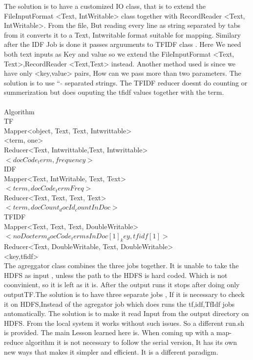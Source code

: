 \documentclass{bigdata}
\newcommand\tab[1][1cm]{\hspace*{#1}}
\begin{document}
The solution is to have a customized IO class, that is to extend the FileInputFormat <Text, IntWritable> class together with RecordReader <Text, IntWritable>. From the file, But reading every line as string separated by tabs from it converts it to a Text, Intwritable format suitable for mapping. Similary after the IDF Job is done it passes arguuments to TFIDF class . Here We need both text inputs as Key and value so we extend the FileInputFormat <Text, Text>,RecordReader <Text,Text> instead. 
Another method used is since we have only <key,value> pairs, How can we pass more than two parameters. The solution is to use $“_”$ separated strings. The TFIDF reducer doesnt do counting or summerization but does ouputing the tfidf values together with the term.\\
\\
Algorithm\\
TF \\
Mapper<object, Text, Text, Intwrittable>\\
      \tab <term, one>\\
Reducer<Text, Intwrittable,Text, Intwrittable>\\
     \tab   $<docCode_term, frequency>$\\
\noindent       
IDF\\
Mapper<Text, IntWritable, Text, Text> \\
     \tab   $<term, docCode_termFreq>$\\
Reducer<Text, Text, Text, Text>\\
    \tab    $<term, docCount_docId_countInDoc>$\\
TFIDF\\
Mapper<Text, Text, Text, DoubleWritable>\\
     \tab    $<noDocterm_docCode_termsInDoc[1]_key, tfidf[1]>$\\
Reducer<Text, DoubleWritable, Text, DoubleWritable>\\
        <key,tfidf>\\
        
The agreggator class combines the three jobs together. It is unable to take the HDFS as input , unless the path to the HDFS is hard coded. Which is not coonvinient, so it is left as it is. After the output runs it stops after doing only outputTF.The solution is to have three separate jobs , If it is necessary to check it on HDFS,Instead of the agregator job which does runs the tf,idf,TfIdf jobs automatically. The solution is to make it read Input from the output directory on HDFS. From the local system it works without such issues. So a different run.sh is provided.
The main Lesson learned here is. When coming up with a map-reduce algorithm it is not necessary to follow the serial version, It has its own new ways that makes it simpler and efficient. It is a different paradigm. 
\end{document}

